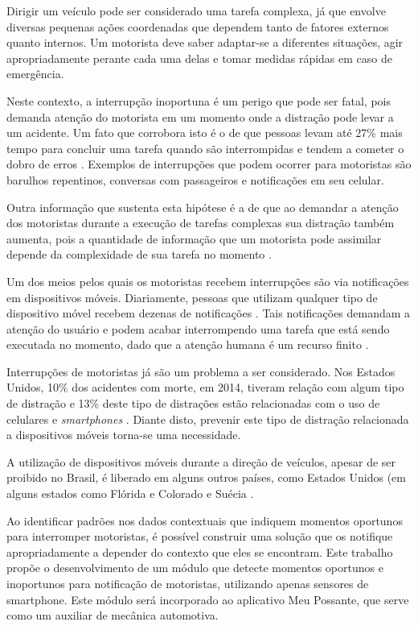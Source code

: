 \label{introducao}

Dirigir um veículo pode ser considerado uma tarefa complexa, já que envolve diversas pequenas ações coordenadas
que dependem tanto de fatores externos quanto internos. Um motorista deve saber adaptar-se a diferentes situações,
agir apropriadamente perante cada uma delas e tomar medidas rápidas em caso de emergência.

Neste contexto, a interrupção inoportuna é um perigo que pode ser fatal, pois demanda atenção do motorista em um momento
onde a distração pode levar a um acidente. Um fato que corrobora isto é o de que pessoas levam até 27\% mais tempo para
concluir uma tarefa quando são interrompidas e tendem a cometer o dobro de erros \cite{bailey2006need}. Exemplos de
interrupções que podem ocorrer para motoristas são barulhos repentinos, conversas com passageiros e notificações em
seu celular.

Outra informação que sustenta esta hipótese é a de que ao demandar a atenção dos motoristas durante a execução de
tarefas complexas sua distração também aumenta, pois a quantidade de informação que um motorista pode assimilar
depende da complexidade de sua tarefa no momento \cite{schneegass2013data}.

Um dos meios pelos quais os motoristas recebem interrupções são via notificações em dispositivos móveis.
Diariamente, pessoas que utilizam qualquer tipo de dispositivo móvel recebem dezenas de notificações
\cite{pielot2014situ}. Tais notificações demandam a atenção do usuário e podem acabar interrompendo uma tarefa que
está sendo executada no momento, dado que a atenção humana é um recurso finito \cite{simon1971designing}.

Interrupções de motoristas já são um problema a ser considerado. Nos Estados Unidos, 10\% dos acidentes com morte, em 2014, tiveram relação
com algum tipo de distração e 13\% deste tipo de distrações estão relacionadas com o uso de celulares e \textit{smartphones}
\cite{distracted2014}. Diante disto, prevenir este tipo de distração relacionada a dispositivos móveis torna-se uma necessidade.

A utilização de dispositivos móveis durante a direção de veículos, apesar de ser proibido no Brasil, é liberado em alguns
outros países, como Estados Unidos (em alguns estados como Flórida e Colorado \cite{cellphoneuse, distracteddriving} e Suécia \cite{swedendrive}.

Ao identificar padrões nos dados contextuais que indiquem momentos oportunos para interromper motoristas, é possível
construir uma solução que os notifique apropriadamente a depender do contexto que eles se encontram. Este trabalho propõe
o desenvolvimento de um módulo que detecte momentos oportunos e inoportunos para notificação de motoristas, utilizando
apenas sensores de smartphone. Este módulo será incorporado ao aplicativo Meu Possante, que serve como um auxiliar de mecânica automotiva.

